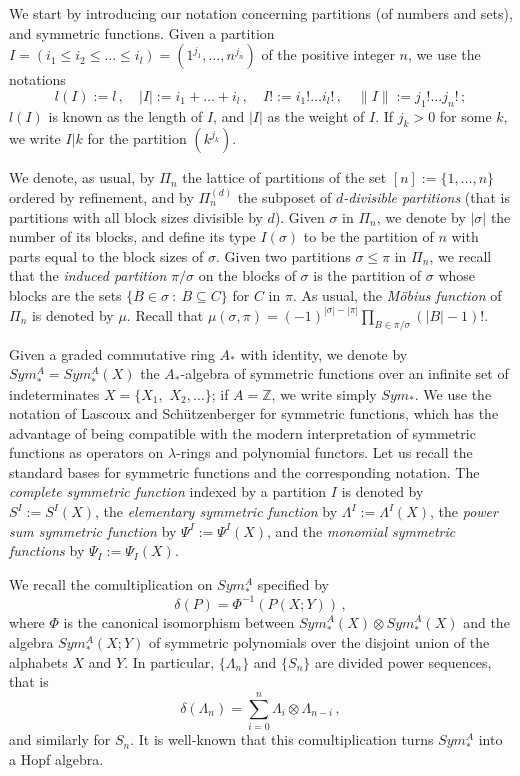 \documentclass[a4paper,12pt]{amsart}
\theoremstyle{definition}
\numberwithin{equation}{section}
\newcommand{\bZ}{{\mathbb Z}}
\newcommand{\s}{\sigma}
\newcommand{\setp}[2]{\{#1\::\:#2\}}
\newcommand{\has}{Hopf algebra}
\newcommand{\sua}{Sym_*^A }
\begin{document}
We start by introducing our notation concerning partitions (of numbers and sets), and symmetric functions. Given a partition $I=(i_1\le i_2\le\ldots\le i_l)=(1^{j_1},\ldots, n^{j_n})$ of the positive integer $n$, we use the notations
\[l(I):=l\,,\quad |I|:=i_1+\ldots+i_l\,,\quad I!:=i_1!\ldots i_l!\,,\quad \|I\|:=j_1!\ldots j_n!\,;\]
$l(I)$ is known as the length of $I$, and $|I|$ as the weight of $I$. If $j_k>0$ for some $k$, we write $I|k$ for the partition $(k^{j_k})$.

We denote, as usual, by $\varPi_n$ the lattice of partitions of the set $[n]:=\{1,\ldots,n\}$ ordered by refinement, and by $\varPi_n^{(d)}$ the subposet of {\it $d$-divisible partitions} (that is partitions with all block sizes divisible by $d$). Given $\s$ in $\varPi_n$, we denote by $|\s|$ the number of its blocks, and define its type $I(\s)$ to be the partition of $n$ with parts equal to the block sizes of $\sigma$. Given two partitions $\s\le\pi$ in $\varPi_n$, we recall that the {\em induced partition} $\pi/\s$ on the blocks of $\s$ is the partition of $\s$ whose blocks are the sets $\setp{B\in\s}{B\subseteq C}$ for $C$ in $\pi$. As usual, the {\em M\"{o}bius function} of $\varPi_n$ is denoted by $\mu$. Recall that $\mu(\s,\pi)=(-1)^{|\s|-|\pi|}\prod_{B\in\pi/\s}(|B|-1)!$. 

Given a graded commutative ring $A_*$ with identity, we denote by $\sua=\sua(X)$ the  $A_*$-algebra of
symmetric functions over an infinite set of indeterminates 
$X=\{X_1,$ $X_2,\ldots\}$; if $A=\bZ$, we write simply $Sym_*$. We use the notation of Lascoux and Sch\"{u}tzenberger
\cite{lasfrf} for symmetric functions, which has the advantage of being
compatible with the modern interpretation of symmetric functions as
operators on $\lambda$-rings and polynomial functors. Let us recall the standard bases for symmetric functions and the corresponding notation. The {\em complete symmetric function} indexed by a partition $I$ is denoted by
$S^I:=S^I(X)$, the {\em elementary symmetric function} by
$\varLambda^I:=\varLambda^I(X)$, the {\em power sum symmetric
function} by $\varPsi^I:=\varPsi^I(X)$, and the {\em monomial symmetric
functions} by $\varPsi_I:=\varPsi_I(X)$. 

We recall the comultiplication on $\sua$ specified by
\[ \delta(P)=\varPhi^{-1}(P(X;Y))\,,\]
where $\varPhi$ is the canonical isomorphism between
$\sua(X)\otimes\sua(X)$ and the algebra $\sua(X;Y)$ of symmetric
polynomials over the disjoint union of the alphabets $X$ and $Y$. In particular, $\{\varLambda_n\}$ and $\{S_n\}$ are divided power sequences, that is
\begin{equation}\label{divpow}
\delta(\varLambda_n)=\sum_{i=0}^n \varLambda_i\otimes\varLambda_{n-i}\,,
\end{equation}
and similarly for $S_n$. It is well-known that this comultiplication turns $\sua$ into a \has. 
\end{document}
